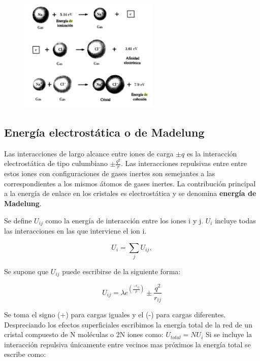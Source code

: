 \documentclass{article}
\begin{document}
\begin{figure}[h]
\centering
\includegraphics[width=0.6\textwidth]{a7.png}
\caption{}
\end{figure}

\subsection{Energía electrostática o de Madelung}

Las interacciones de largo alcance entre iones de carga $\pm q$ es la interacción electrostática de tipo culumbiano $\pm\frac{q^2}{r}$. Las interacciones repulsivas entre entre estos iones con configuraciones de gases inertes son semejantes a las correspondientes a los mismos átomos de gases inertes. La contribución principal a la energía de enlace en los cristales es electrostática y se denomina \textbf{energía de Madelung}.

Se define $U_{ij}$ como la energía de interacción entre los iones i y j. $U_i$ incluye todas las interacciones en las que interviene el ion i.

\begin{equation}
   U_{i}= \sum_{j} U_{ij} ,
 \label{eq2}
\end{equation}{}

Se supone que $U_{ij}$ puede escribirse de la siguiente forma:

\begin{equation}
   U_{ij}=\lambda e^{(\frac{-r_{ij}}{\rho})}\pm \frac{q^2}{r_{ij}} 
    \label{eq2}
\end{equation}

Se toma el signo (+) para cargas iguales y el (-) para cargas diferentes.\\

Despreciando los efectos superficiales escribimos la energía total de la red de un cristal  compuesto de N moléculas o 2N iones como: $U_{total}=NU_i$ Si se incluye la interacción repulsiva únicamente entre vecinos mas próximos la energía total se escribe como:\\
\end{document}
